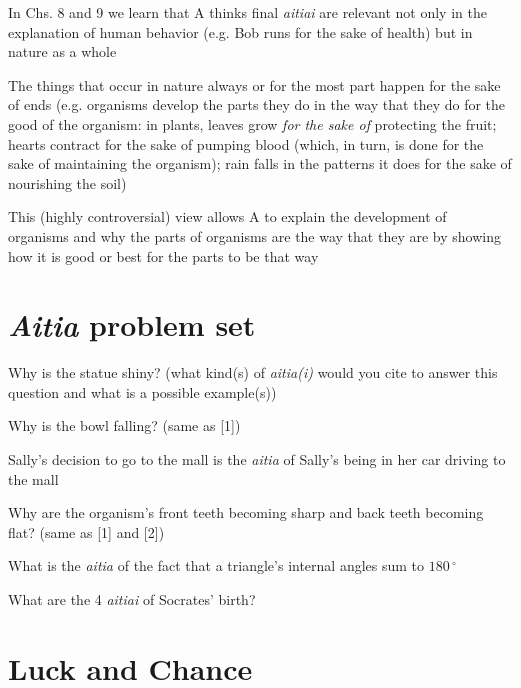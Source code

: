 \documentclass[oneside]{article}
\begin{document}
\noindent In Chs. 8 and 9 we learn that A thinks final \emph{aitiai} are relevant not only in the explanation of human behavior (e.g. Bob runs for the sake of health) but in nature as a whole

\noindent The things that occur in nature always or for the most part happen for the sake of ends (e.g. organisms develop the parts they do in the way that they do for the good of the organism: in plants, leaves grow \emph{for the sake of} protecting the fruit; hearts contract for the sake of pumping blood (which, in turn, is done for the sake of maintaining the organism); rain falls in the patterns it does for the sake of nourishing the soil)
\vspace*{1mm}

\noindent This (highly controversial) view allows A to explain the development of organisms and why the parts of organisms are the way that they are by showing how it is good or best for the parts to be that way

\section*{\emph{Aitia} problem set}

\noindent [1] Why is the statue shiny? (what kind(s) of \emph{aitia(i)} would you cite to answer this question and what is a possible example(s))
\vspace*{3mm}

\noindent [2] Why is the bowl falling? (same as [1])
\vspace*{3mm}

\noindent [3] Sally's decision to go to the mall is the\hspace*{25mm} \emph{aitia} of Sally's being in her car driving to the mall
\vspace*{3mm}

\noindent [4] Why are the organism's front teeth becoming sharp and back teeth becoming flat? (same as [1] and [2]) 
\vspace*{3mm}

\noindent [5] What is the \emph{aitia} of the fact that a triangle's internal angles sum to $180\,^{\circ}$
\vspace*{3mm}

\noindent [6] What are the 4 \emph{aitiai} of Socrates' birth?

\section*{Luck and Chance}
\end{document}
